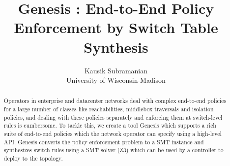 \documentclass[]{sig}
\title{Genesis : End-to-End Policy Enforcement by Switch Table Synthesis }
\author{Kausik Subramanian \\
	University of Wisconsin-Madison}
\begin{document}
\maketitle

\begin{abstract}
Operators in enterprise and datacenter networks deal with complex end-to-end policies for a large number of classes like reachabilities, middlebox traversals and isolation policies, and dealing with these policies separately and enforcing them at switch-level rules is cumbersome. To tackle this, we create a tool Genesis which supports a rich suite of end-to-end policies which the network operator can specify using a high-level API. Genesis converts the policy enforcement problem to a SMT instance and synthesizes switch rules using a SMT solver (Z3) which can be used by a controller to deploy to the topology.
\end{abstract}

\end{document}
